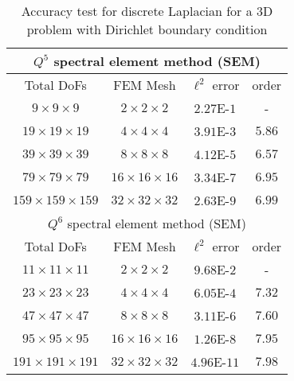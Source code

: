 \begin{table}[!ht]
    \centering
    \begin{tabular}{|c|c|c c|}
    \hline
    \multicolumn{4}{|c|}{$Q^5$ spectral element method (SEM)}\\
    \hline
    Total DoFs & FEM Mesh & $\ell^2$ error & order\\
    \hline
    $9\times 9\times 9$ & $2\times 2 \times 2$ & $2.27$E-$1$ & - \\
    \hline
    $19\times 19\times 19$ & $4\times 4 \times 4$ & $3.91$E-$3$ & $5.86$\\
    \hline
    $39\times 39\times 39$ & $8\times 8 \times 8$ & $4.12$E-$5$ & $6.57$ \\
    \hline
    $79\times 79\times 79$ & $16\times 16 \times 16$ & $3.34$E-$7$ & $6.95$ \\
    \hline
    $159\times 159\times 159$ & $32\times 32 \times 32$ & $2.63$E-$9$ & $6.99$ \\
    \hline
    \multicolumn{4}{|c|}{$Q^6$ spectral element method (SEM)}\\
    \hline
    Total DoFs & FEM Mesh & $\ell^2$ error & order\\
    \hline
    $11\times 11\times 11$ & $2\times 2 \times 2$ & $9.68$E-$2$ & - \\
    \hline
    $23\times 23\times 23$ & $4\times 4 \times 4$ & $6.05$E-$4$ & $7.32$ \\
    \hline
    $47\times 47\times 47$ & $8\times 8 \times 8$ & $3.11$E-$6$ & $7.60$ \\
    \hline
    $95\times 95\times 95$ & $16\times 16 \times 16$ & $1.26$E-$8$ & $7.95$ \\
    \hline
    $191\times 191\times 191$ & $32\times 32 \times 32$ & $4.96$E-$11$ & $7.98$ \\
    \hline
    \end{tabular}
    \caption{Accuracy test for discrete Laplacian for a 3D problem with Dirichlet boundary condition}
    \label{tab1:accuracy test dirichlet}
\end{table}

